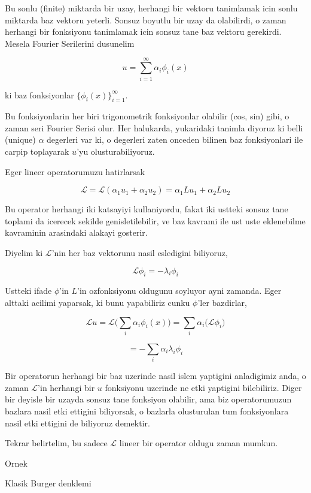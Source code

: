 \documentclass[12pt,fleqn]{article}\usepackage{../common}
\begin{document}
Bu sonlu (finite) miktarda bir uzay, herhangi bir vektoru tanimlamak icin
sonlu miktarda baz vektoru yeterli. Sonsuz boyutlu bir uzay da olabilirdi,
o zaman herhangi bir fonksiyonu tanimlamak icin sonsuz tane baz vektoru
gerekirdi. Mesela Fourier Serilerini dusunelim

\[ u = \sum_{i=1}^{\infty} \alpha_i \phi_i(x) \]

ki baz fonksiyonlar $\bigg\{ \phi_i(x)  \bigg\}_{i=1}^\infty$.

Bu fonksiyonlarin her biri trigonometrik fonksiyonlar olabilir (cos, sin)
gibi, o zaman seri Fourier Serisi olur. Her halukarda, yukaridaki tanimla
diyoruz ki belli (unique) $\alpha$ degerleri var ki, o degerleri zaten
onceden bilinen baz fonksiyonlari ile carpip toplayarak $u$'yu
olusturabiliyoruz.

Eger lineer operatorumuzu hatirlarsak

\[ \mathcal{L} = \mathcal{L}(\alpha_1 u_1 + \alpha_2 u_2) = 
\alpha_1 Lu_1 + \alpha_2 Lu_2 \]

Bu operator herhangi iki katsayiyi kullaniyordu, fakat iki ustteki sonsuz
tane toplami da icerecek sekilde genisletilebilir, ve baz kavrami ile ust
uste eklenebilme kavraminin arasindaki alakayi gosterir. 

Diyelim ki $\mathcal{L}$'nin her baz vektorunu nasil esledigini biliyoruz, 

\[ \mathcal{L} \phi_i = -\lambda_i \phi_i \]

Ustteki ifade $\phi$'in $L$'in ozfonksiyonu oldugunu soyluyor ayni
zamanda. Eger alttaki acilimi yaparsak, ki bunu yapabiliriz cunku
$\phi$'ler bazdirlar, 

\[ \mathcal{L}u = \mathcal{L} \bigg( \sum_i \alpha_i \phi_i(x) \bigg) =
\sum_i \alpha_i \bigg( \mathcal{L} \phi_i \bigg)
 \]

\[ = -\sum_i \alpha_i \lambda_i \phi_i  \]

Bir operatorun herhangi bir baz uzerinde nasil islem yaptigini anladigimiz
anda, o zaman $\mathcal{L}$'in herhangi bir $u$ fonksiyonu uzerinde ne etki yaptigini
bilebiliriz. Diger bir deyisle bir uzayda sonsuz tane fonksiyon olabilir,
ama biz operatorumuzun bazlara nasil etki ettigini biliyorsak, o bazlarla
olusturulan tum fonksiyonlara nasil etki ettigini de biliyoruz demektir. 

Tekrar belirtelim, bu sadece $\mathcal{L}$ lineer bir operator oldugu zaman mumkun. 

Ornek

Klasik Burger denklemi
\end{document}
